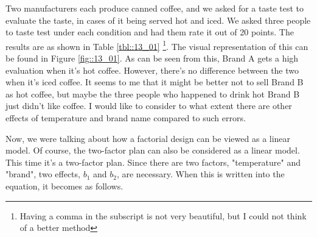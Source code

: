 \documentclass{ltjbook}
\begin{document}
Two manufacturers each produce canned coffee, and we asked for a taste test to evaluate the taste, in cases of it being served hot and iced. We asked three people to taste test under each condition and had them rate it out of 20 points. The results are as shown in Table \ref {tbl::13_01} \footnote {Having a comma in the subscript is not very beautiful, but I could not think of a better method}. The visual representation of this can be found in Figure \ref {fig::13_01}.
As can be seen from this, Brand A gets a high evaluation when it's hot coffee. However, there's no difference between the two when it's iced coffee.
It seems to me that it might be better not to sell Brand B as hot coffee, but maybe the three people who happened to drink hot Brand B just didn't like coffee.
I would like to consider to what extent there are other effects of temperature and brand name compared to such errors.


Now, we were talking about how a factorial design can be viewed as a linear model.
Of course, the two-factor plan can also be considered as a linear model. This time it's a two-factor plan. Since there are two factors, "temperature" and "brand", two effects, $b_1$ and $b_2$, are necessary. When this is written into the equation, it becomes as follows.

\end{document}
